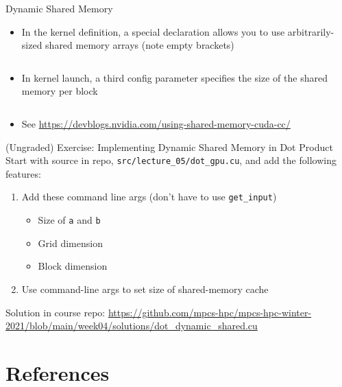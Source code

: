 \documentclass{beamer}
\begin{document}
    \begin{frame}{Dynamic Shared Memory}
        \begin{itemize}
            \item In the kernel definition, a special declaration allows you to use arbitrarily-sized shared memory arrays (note empty brackets)
            \begin{block}{}
                \inputminted{cuda}{src/shared_01.cu}
            \end{block}
            \item In kernel launch, a third config parameter specifies the size of the shared memory per block
            \begin{block}{}
                \inputminted{cuda}{src/shared_02.cu}
            \end{block}
            \item See \url{https://devblogs.nvidia.com/using-shared-memory-cuda-cc/}
        \end{itemize}
    \end{frame}

    \begin{frame}{(Ungraded) Exercise: Implementing Dynamic Shared Memory in Dot Product}
        Start with source in repo, \texttt{src/lecture\_05/dot\_gpu.cu}, and add
        the following features:
        \begin{enumerate}
            \item Add these command line args (don't have to use \texttt{get\_input})
            \begin{itemize}
                \item Size of \texttt{a} and \texttt{b}
                \item Grid dimension
                \item Block dimension
            \end{itemize}
            \item Use command-line args to set size of shared-memory cache
        \end{enumerate}
        Solution in course repo: \url{https://github.com/mpcs-hpc/mpcs-hpc-winter-2021/blob/main/week04/solutions/dot_dynamic_shared.cu}
    \end{frame}

    \section{References}
\end{document}
